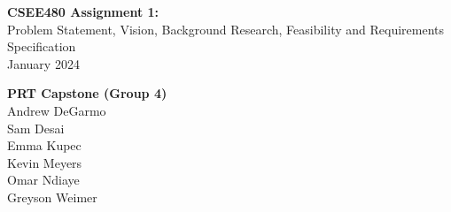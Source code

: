 \begin{titlepage}
    \begin{center}
        \vspace*{\fill}
        \huge
        \textbf{CSEE480 Assignment 1:}\\
        \vspace{0.5cm}
        \large
        Problem Statement, Vision, Background Research, Feasibility and Requirements Specification\\
        \vspace{0.25cm}
        January 2024\\
        \vspace*{\fill}
    \end{center}
    \newpage
    \begin{center}
        \vspace*{\fill}
        \textbf{PRT Capstone (Group 4)}\\
        Andrew DeGarmo\\
        Sam Desai\\
        Emma Kupec\\
        Kevin Meyers\\
        Omar Ndiaye\\
        Greyson Weimer\\
        \vspace*{\fill}
    \end{center}
\end{titlepage}